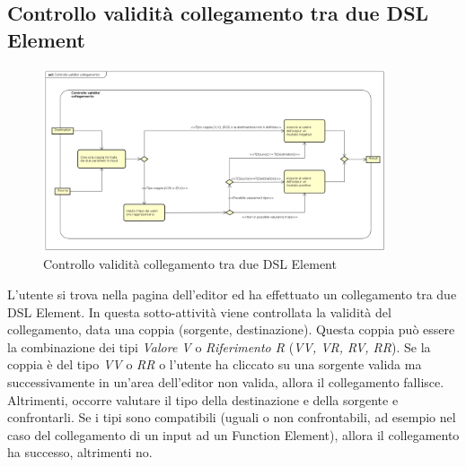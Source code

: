     \subsection{Controllo validità collegamento tra due DSL Element}
    \begin{figure}[H]
      \centering
      \includegraphics[width=0.9\textwidth]{res/img/controlloCollegamento.png}
      \caption{Controllo validità collegamento tra due DSL Element}
      \label{fig:diagram_model}
    \end{figure}
L'utente si trova nella pagina dell'editor ed ha effettuato un collegamento tra due DSL Element. In questa sotto-attività viene controllata la validità del collegamento, data una coppia (sorgente, destinazione). Questa coppia può essere la combinazione dei tipi \textit{Valore V} o \textit{Riferimento R} (\textit{VV, VR, RV, RR}). Se la coppia è del tipo \textit{VV} o \textit{RR} o l'utente ha cliccato su una sorgente valida ma successivamente in un'area dell'editor non valida, allora il collegamento fallisce. Altrimenti, occorre valutare il tipo della destinazione e della sorgente e confrontarli. Se i tipi sono compatibili (uguali o non confrontabili, ad esempio nel caso del collegamento di un input ad un Function Element), allora il collegamento ha successo, altrimenti no. 
